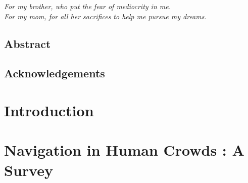 \documentclass[twoside,10pt]{report}
\newcommand*\NewPage{\newpage\null\thispagestyle{empty}\newpage}
\begin{document}



\clearpage

\NewPage

\vspace*{4cm}
\begin{center}
  \textit{For my brother, who put the fear of mediocrity in me.} \\
  \textit{For my mom, for all her sacrifices to help me pursue my dreams.}
\end{center}


\setcounter{page}{1}
\NewPage
\begin{centering} \section*{Abstract} \end{centering}


\NewPage

\begin{centering} \section*{Acknowledgements} \end{centering}


\NewPage


\tableofcontents
\clearpage

\NewPage

\clearpage \listoffigures
\clearpage \listoftables
\clearpage
\NewPage

\setcounter{page}{1}


\chapter{Introduction}
\label{chap:introduction}


\clearpage

\chapter{Navigation in Human Crowds : A Survey}
\label{chap:survey}

\end{document}
